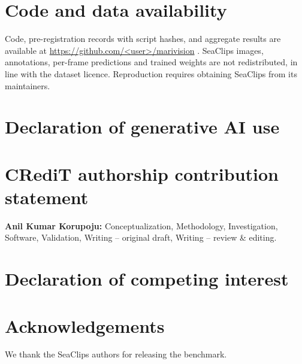 \section*{Code and data availability}\label{sec:statements}
Code, pre-registration records with script hashes, and aggregate results are available at \url{https://github.com/<user>/marivision} . SeaClips images, annotations, per-frame predictions and trained weights are not redistributed, in line with the dataset licence. Reproduction requires obtaining SeaClips from its maintainers.

\section*{Declaration of generative AI use}

\section*{CRediT authorship contribution statement}
\textbf{Anil Kumar Korupoju:} Conceptualization, Methodology, Investigation, Software, Validation, Writing -- original draft, Writing -- review \& editing. 

\section*{Declaration of competing interest}

\section*{Acknowledgements}
We thank the SeaClips authors for releasing the benchmark. 
